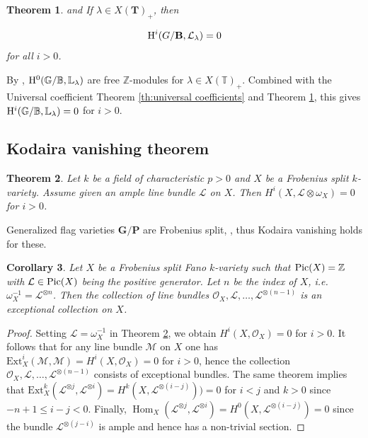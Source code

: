 \documentclass[sn-mathphys-num]{sn-jnl}%
\newcommand{\Oo}{\mathcal O}
\newcommand{\Ll}{\mathcal L}
\newcommand{\Ext}{{\mathrm{Ext}}}
\newcommand*{\Hom}{\mathop{\mathrm {Hom}}\nolimits}
\newcommand{\Tm}{\mathbb T}
\newcommand{\bg}{\mathbf G}
\newcommand{\fb}{\mathbf B}
\newcommand{\bt}{\mathbf T}
\newcommand{\bp}{\mathbf P}
\newtheorem{theorem}{Theorem}[section]
\newtheorem{corollary}[theorem]{Corollary}
\theoremstyle{definition}
\begin{document}
\begin{theorem}\cite[Part II, Proposition 4.5]{Jan}\label{th:Kempf_van} and \cite[Section 2.6]{Donkin2}
If $\lambda \in X({\bt})_+$, then 

$$
{\rm H}^i({ G}/{\fb},\Ll _{\lambda})=0
$$
for all $i>0$.

\end{theorem}

By \cite[Corollary 2.6, (ii)]{AndChev}, $
{\rm H}^0({\mathbb G}/{\mathbb B},{\mathbb L} _{\lambda})$ are free $\mathbb Z$-modules for $\lambda \in X({\Tm})_+$. Combined with 
the Universal coefficient Theorem \ref{th:universal coefficients} and 
Theorem \ref{th:Kempf_van}, this gives ${\rm H}^i({\mathbb G}/{\mathbb B},{\mathbb L} _{\lambda})=0$ for $i>0$.

\subsection{Kodaira vanishing theorem}

\begin{theorem}\cite[Theorem 1.2.9]{BK}\label{th:Kodaira_van}
Let $k$ be a field of characteristic $p>0$ and $X$ be a Frobenius split $k$-variety. Assume given an ample line bundle $\Ll$ on $X$. Then $H^i(X,\Ll \otimes \omega _X)=0$ for $i>0$.
\end{theorem}

Generalized flag varieties $ \bg/\bp$ are Frobenius split, \cite[Theorem 2.2.5]{BK}, thus Kodaira vanishing holds for these.

\begin{corollary}\label{cor:excseqlinebun}
Let $X$ be a Frobenius split Fano $k$-variety such that ${\rm Pic}(X)=\mathbb Z$ with $\Ll\in {\rm Pic}(X)$ being the positive generator. Let $n$ be the index of $X$, i.e.\ $\omega _{X}^{-1}=\Ll ^{\otimes n}$. Then the collection of line bundles $\Oo _X,\Ll,\dots, \Ll ^{\otimes (n-1)}$ is an exceptional collection on $X$.
\end{corollary}

\begin{proof}
Setting $\Ll=\omega _{X}^{-1}$ in Theorem \ref{th:Kodaira_van}, we obtain $H^i(X,\Oo _X)=0$ for $i>0$. It follows that for any line bundle $\mathcal M$ on $X$ one has $\Ext _X^i({\mathcal M},{\mathcal M})=H^i(X,\Oo _X)=0$ for $i>0$, hence the collection $\Oo _X,\Ll,\dots, \Ll ^{\otimes (n-1)}$ consists of exceptional bundles. The same theorem implies that $\Ext _X^k(\Ll ^{\otimes j},\Ll ^{\otimes i})=H^k(X,\Ll ^{\otimes (i-j)}))=0$ for $i<j$ and $k>0$ since $-n+1\leq i-j<0$. Finally, $\Hom _X(\Ll ^{\otimes j},\Ll ^{\otimes i})=H^0(X,\Ll ^{\otimes (i-j)})=0$ since the bundle $\Ll ^{\otimes (j-i)}$ is ample and hence has a non-trivial section.
\end{proof}
\end{document}
